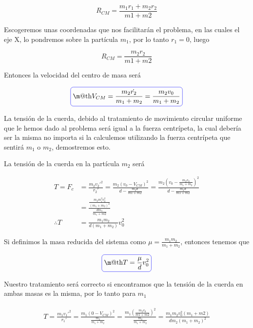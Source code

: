 \documentclass[a4paper,10pt]{article}
\makeatletter
\newcommand*{\boxcolor}{blue}
\renewcommand{\boxed}[1]{\textcolor{\boxcolor}{%
\tikz[baseline={([yshift=-1ex]current bounding box.center)}] \node [rectangle, minimum width=1ex,rounded corners,draw] {\normalcolor\m@th$\displaystyle#1$};}}
\makeatother
\begin{document}
\begin{equation}
 R_{CM} = \frac{m_1 r_1 + m_2 r_2}{m1+m2}
 \label{eq:RadioCM1}
\end{equation}

Escogeremos unas coordenadas que nos facilitarán el problema, en las cuales el eje
X, lo pondremos sobre la partícula $m_1$, por lo tanto $r_1 = 0$, luego

\begin{equation}
 R_{CM} = \frac{m_2 r_2}{m1+m2}
 \label{eq:RadioCM2}
\end{equation}

Entonces la velocidad del centro de masa será

\begin{equation}
 \boxed{V_{CM} = \frac{m_2 \dot{r_2}}{m_1+m_2} = \frac{m_2 v_0}{m_1 + m_2}}
\end{equation}

La tensión de la cuerda, debido al tratamiento de movimiento circular uniforme que 
le hemos dado al problema será igual a la fuerza centrípeta, la cual debería ser
la misma no importa si la calculemos utilizando la fuerza centrípeta que 
sentirá $m_1$ o $m_2$, demostremos esto. 

\vspace{.3cm}

La tensión de la cuerda en la partícula $m_2$ será

\begin{align*}
 T = F_c &= \frac{m_2 v_2'^2}{r_2'} = \frac{m_2 (v_0-V_{CM})^2}{d - \frac{m_2 d}{m1+m2}} = 
 \frac{m_2 (v_0 - \frac{m_2 v_0}{m_1 + m_2})^2}{d - \frac{m_2 d}{m1+m2}} \\
 &= \frac{\frac{m_2 m_1^2 v_0^2}{(m_1+m_2)^2}}{\frac{d m_1}{m_1 + m2}} \\
%
 \therefore T &= \frac{m_1 m_2}{d(m_1 + m_2)} v_0^2
\end{align*}

Si definimos la masa reducida del sistema como $\mu = \frac{m_1 m_2}{m_1 + m_2}$, 
entonces tenemos que

\begin{equation}
 \boxed{T = \frac{\mu}{d} v_0^2}
 \label{eq:TensionM2}
\end{equation}

Nuestro tratamiento será correcto si encontramos que la tensión de la cuerda
en ambas masas es la misma, por lo tanto para $m_1$

\begin{align*}
\begin{split}
 T = \frac{m_1 v_1'^2}{r_1'} = \frac{m_1(0 - V_{CM})^2}{\frac{m_2}{m_1+m_2}} =
 \frac{m_1 (\frac{m_2 v_0}{m1+m2})^2}{\frac{m_2}{m_1+m_2}} =
 \frac{m_1 m_2 v_0^2 (m_1 + m2)}{d m_2 (m_1 + m_2)^2} \\
 \end{split}
\end{align*}
\end{document}
